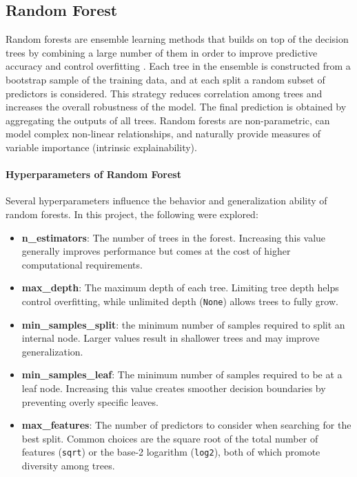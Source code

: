 \subsection{Random Forest}\label{subsec:method-rand-forest}
Random forests are ensemble learning methods that builds on top of the decision trees by combining a large number of them in order to improve predictive accuracy and control overfitting \citep{Breiman2001}. Each tree in the ensemble is constructed from a bootstrap sample of the training data, and at each split a random subset of predictors is considered. This strategy reduces correlation among trees and increases the overall robustness of the model. The final prediction is obtained by aggregating the outputs of all trees. Random forests are non-parametric, can model complex non-linear relationships, and naturally provide measures of variable importance (intrinsic explainability).

\paragraph{Hyperparameters of Random Forest}
Several hyperparameters influence the behavior and generalization ability of random forests. In this project, the following were explored:
\begin{itemize}
    \item \textbf{n\_estimators}: The number of trees in the forest. Increasing this value generally improves performance but comes at the cost of higher computational requirements.
    \item \textbf{max\_depth}: The maximum depth of each tree. Limiting tree depth helps control overfitting, while unlimited depth (\texttt{None}) allows trees to fully grow.
    \item \textbf{min\_samples\_split}: the minimum number of samples required to split an internal node. Larger values result in shallower trees and may improve generalization.
    \item \textbf{min\_samples\_leaf}: The minimum number of samples required to be at a leaf node. Increasing this value creates smoother decision boundaries by preventing overly specific leaves.
    \item \textbf{max\_features}: The number of predictors to consider when searching for the best split. Common choices are the square root of the total number of features (\texttt{sqrt}) or the base-2 logarithm (\texttt{log2}), both of which promote diversity among trees.
\end{itemize}

